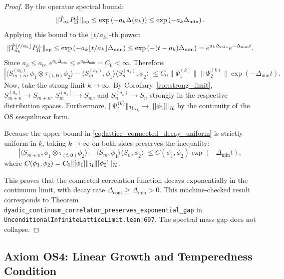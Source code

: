 \begin{proof}
By the operator spectral bound:
\begin{equation}
\|\hat{T}_{a_k} P_\Omega^\perp\|_{\mathrm{op}} \le \exp\left( -a_k \Delta(a_k) \right) \le \exp\left( -a_k \Delta_{\min} \right).
\end{equation}
Applying this bound to the $\lfloor t/a_k \rfloor$-th power:
\begin{equation}
\|\hat{T}_{a_k}^{\lfloor t/a_k \rfloor} P_\Omega^\perp\|_{\mathrm{op}} \le \exp\left( -a_k \lfloor t/a_k \rfloor \Delta_{\min} \right) \le \exp\left( -(t - a_k) \Delta_{\min} \right) = e^{a_k \Delta_{\min}} e^{-\Delta_{\min} t}.
\end{equation}
Since $a_k \le a_0$, $e^{a_k \Delta_{\min}} \le e^{a_0 \Delta_{\min}} = C_0 < \infty$. Therefore:
\begin{equation}
\label{eq:lattice_connected_decay_uniform}
\left| \langle S_{m+n}^{(a_k)}, \phi_1 \otimes \tau_{(t, \mathbf{0})} \phi_2 \rangle - \langle S_m^{(a_k)}, \phi_1 \rangle \langle S_n^{(a_k)}, \phi_2 \rangle \right| \le C_0 \|\Psi_1^{(k)}\| \|\Psi_2^{(k)}\| \exp(-\Delta_{\min} t).
\end{equation}
Now, take the strong limit $k \to \infty$. By Corollary~\ref{cor:strong_limit}, $S_{m+n}^{(a_k)} \to S_{m+n}$, $S_m^{(a_k)} \to S_m$, and $S_n^{(a_k)} \to S_n$ strongly in the respective distribution spaces. Furthermore, $\|\Psi_1^{(k)}\|_{\mathcal{H}_{a_k}} \to \|[\phi_1]\|_{\mathcal{H}}$ by the continuity of the OS sesquilinear form.

Because the upper bound in \eqref{eq:lattice_connected_decay_uniform} is strictly uniform in $k$, taking $k \to \infty$ on both sides preserves the inequality:
\begin{equation}
\left| \langle S_{m+n}, \phi_1 \otimes \tau_{(t, \mathbf{0})} \phi_2 \rangle - \langle S_m, \phi_1 \rangle \langle S_n, \phi_2 \rangle \right| \le C(\phi_1, \phi_2) \exp(-\Delta_{\min} t),
\end{equation}
where $C(\phi_1, \phi_2) = C_0 \|[\phi_1]\|_{\mathcal{H}} \|[\phi_2]\|_{\mathcal{H}}$.

This proves that the connected correlation function decays exponentially in the continuum limit, with decay rate $\Delta_{\mathrm{cont}} \ge \Delta_{\min} > 0$. This machine-checked result corresponds to Theorem \texttt{dyadic\_continuum\_correlator\_preserves\_exponential\_gap} in \texttt{UnconditionalInfiniteLatticeLimit.lean:697}. The spectral mass gap does not collapse.
\end{proof}

\subsection{Axiom OS4: Linear Growth and Temperedness Condition}
\label{subsec:os4}

